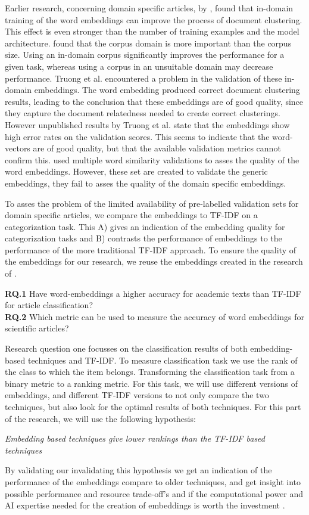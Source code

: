 \documentclass[../../Thesis.tex]{subfiles}
\begin{document}
Earlier research, concerning domain specific articles, by \citet{Truong2017Thesis}, found that in-domain training of the word embeddings can  improve the process of document clustering. This effect is even stronger than the number of training examples and the model architecture. \citet{lai2016generate} found that the corpus domain is more important than the corpus size. Using an in-domain corpus significantly improves the performance for a given task, whereas using a corpus in an unsuitable domain may decrease performance.
Truong et al. encountered a problem in the validation of these in-domain embeddings. The word embedding produced correct document clustering results, leading to the conclusion that these embeddings are of good quality, since they capture the document relatedness needed to create correct clusterings. However unpublished results by Truong et al. state that the embeddings show high error rates on the validation scores. This seems to indicate that the word-vectors are of good quality, but that the available validation metrics cannot confirm this. \citet{Truong2017Thesis} used multiple word similarity validations to asses the quality of the word embeddings. However, these set are created to validate the generic embeddings, they fail to asses the quality of the domain specific embeddings.

To asses the problem of the limited availability of pre-labelled validation sets for domain specific articles, we compare the embeddings to  TF-IDF on a categorization task. This A) gives an indication of the embedding quality for categorization tasks and B) contrasts the performance of embeddings to the performance of the more traditional TF-IDF approach. To ensure the quality of the embeddings for our research, we reuse the embeddings created in the research of \citet{Truong2017Thesis}.
\begin{jumpin}
	\textbf{RQ.1} Have word-embeddings a higher accuracy for academic texts than TF-IDF for article classification?\\
	\textbf{RQ.2} Which metric can be used to measure the accuracy of word embeddings for scientific articles?
\end{jumpin}
Research question one focusses on the classification results of both embedding-based techniques and TF-IDF.  To measure classification task we use the rank of the class to which the item belongs. Transforming the classification task from a binary metric to a ranking metric. For this task, we will use different versions of embeddings, and different TF-IDF versions to not only compare the two techniques, but also look for the optimal results of both techniques. For this part of the research, we will use the following hypothesis:
\begin{center}
\textit{Embedding based techniques give lower rankings than the TF-IDF based techniques}
\end{center}
By validating our invalidating  this hypothesis we get an indication of the performance of the embeddings compare to older techniques, and get insight into possible performance and resource trade-off's and if the computational power and AI expertise needed for the creation of embeddings is worth the investment .
\end{document}
